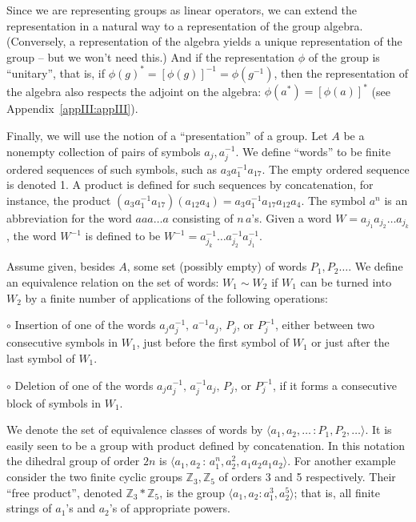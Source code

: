 \documentclass[reqno]{stml-l}
\theoremstyle{plain}
\theoremstyle{definition}
\numberwithin{equation}{chapter}
\begin{document}
Since we are representing groups as linear operators, we can extend the representation in a natural way to a representation of the group algebra. (Conversely, a representation of the algebra yields a unique representation of the group -- but we won't need this.) And if the representation $\phi$ of the group is ``unitary'', that is, if $\phi(g)^{\ast}=[\phi(g)]^{-1}=\phi(g^{-1})$, then the representation of the algebra also respects the adjoint on the algebra: $\phi(a^{\ast})=[\phi(a)]^{\ast}$ (see Appendix~\ref{appIII:appIII}).

Finally, we will use the notion of a ``presentation'' of a group. Let $A$ be a nonempty collection of pairs of symbols $a_{j},a_{j}^{-1}$. We define ``words'' to be finite ordered sequences of such symbols, such as $a_{3}a_{1}^{-1}a_{17}$. The empty ordered sequence is denoted 1. A product is defined for such sequences by concatenation, for instance, the product $(a_{3}a_{1}^{-1}a_{17})(a_{12}a_{4})=a_{3}a_{1}^{-1}a_{17}a_{12}a_{4}$. The symbol $a^{n}$ is an abbreviation for the word $aaa\ldots a$ consisting of $n\,a$'s. Given a word $W= a_{j_{1}}a_{j_{2}}\ldots a_{j_{k}}$, the word $W^{-1}$ is defined to be $W^{-1}=a_{j_{k}}^{-1}\ldots a_{j_{2}}^{-1}a_{j_{1}}^{-1}$.

Assume given, besides $A$, some set (possibly empty) of words $P_{1}, P_{2}\ldots$. We define an equivalence relation on the set of words: $W_{1}\sim W_{2}$ if $W_{1}$ can be turned into $W_{2}$ by a finite number of applications of the following operations:

$\circ$ Insertion of one of the words $a_{j}a_{j}^{-1},\,a^{-1}a_{j},\,P_{j}$, or $P_{j}^{-1}$, either between two consecutive symbols in $W_{1}$, just before the first symbol of $W_{1}$ or just after the last symbol of $W_{1}$.

$\circ$ Deletion of one of the words $a_{j}a_{j}^{-1},\,a_{j}^{-1}a_{j},\,P_{j}$, or $P_{j}^{-1}$, if it forms a consecutive block of symbols in $W_{1}$. 

We denote the set of equivalence classes of words by $\langle a_{1},a_{2},\ldots\,:P_{1},P_{2},\ldots\rangle$. It is easily seen to be a group with product defined by concatenation. In this notation the dihedral group of order $2n$ is $\langle a_{1},a_{2}\,:\,a_{1}^{n},a_{2}^{2}, a_{1}a_{2}a_{1}a_{2}\rangle$. For another example consider the two finite cyclic groups $\mathbb{Z}_{3},\mathbb{Z}_{5}$ of orders 3 and 5 respectively. Their ``free product'', denoted $\mathbb{Z}_{3}\ast \mathbb{Z}_{5}$, is the group $\langle a_{1},a_{2}:a_{1}^{3}, a_{2}^{5}\rangle$; that is, all finite strings of $a_{1}$'s and $a_{2}$'s of appropriate powers.
\end{document}
